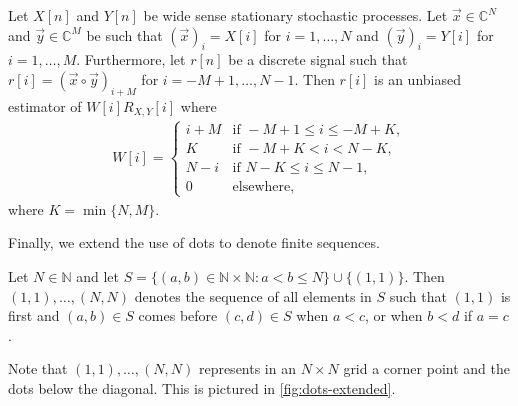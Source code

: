 \documentclass[a4paper, openany, oneside]{memoir}
\begin{document}
\begin{blockTheorem} 
    Let $X[n]$ and $Y[n]$ be wide sense stationary stochastic processes. Let $\vec{x} \in \mathbb{C}^N$ and $\vec{y} \in \mathbb{C}^M$ be such that $(\vec{x})_i = X[i]$ for $i=1,\ldots,N$ and $(\vec{y})_i = Y[i]$ for $i=1,\ldots,M$. Furthermore, let $r[n]$ be a discrete signal such that $r[i] = (\vec{x} \circ \vec{y})_{i+M}$ for $i = -M+1,\ldots,N-1$. Then $r[i]$ is an unbiased estimator of $W[i]R_{X,Y}[i]$ where
    \begin{align*}
        W[i] = \begin{cases}
            i + M & \text{if } -M + 1 \le i \le -M + K, \\
            K & \text{if } -M + K < i < N - K, \\
            N - i & \text{if } N - K \le i \le N - 1, \\
            0 & \text{elsewhere,}
        \end{cases}
    \end{align*}
    where $K = \min\{N,M\}$.
\end{blockTheorem}

Finally, we extend the use of dots to denote finite sequences.

\begin{blockDefinition} 
    Let $N \in \mathbb{N}$ and let $S=\{(a,b) \in \mathbb{N} \times \mathbb{N} : a < b \le N\}\cup \{(1,1)\}$. Then $(1,1),\ldots,(N,N)$ denotes the sequence of all elements in $S$ such that $(1,1)$ is first and $(a,b) \in S$ comes before $(c,d) \in S$ when $a < c$, or when $b < d$ if $a = c$.
\end{blockDefinition}

Note that $(1,1),\ldots,(N,N)$ represents in an $N \times N$ grid a corner point and the dots below the diagonal. This is pictured in \cref{fig:dots-extended}.
\end{document}
